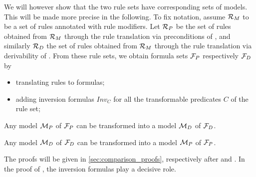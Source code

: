 We will however show that the two rule sets have corresponding sets of
models. This will be made more precise in the following. To fix notation,
assume ${\cal R}_M$ to be a set of rules annotated with rule modifiers. Let
${\cal R}_P$ be the set of rules obtained from ${\cal R}_M$ through the rule
translation via preconditions of , and similarly
${\cal R}_D$ the set of rules obtained from ${\cal R}_M$ through the rule
translation via derivability of . From these rule
sets, we obtain formula sets ${\cal F}_P$ respectively ${\cal F}_D$ by
\begin{itemize}
\item translating rules to formulas;
\item adding inversion formulas $Inv_C$ for all
  the transformable predicates $C$ of the rule set;
\end{itemize}


\begin{proposition}\label{lemma:mp_to_md}
  Any model ${\cal M}_P$ of ${\cal F}_P$ can be transformed into a model
  ${\cal M}_D$ of ${\cal F}_D$.
\end{proposition}

\begin{proposition}\label{lemma:md_to_mp}
  Any model ${\cal M}_D$ of ${\cal F}_D$ can be transformed into a model
  ${\cal M}_P$ of ${\cal F}_P$.
\end{proposition}

The proofs will be given in \ref{sec:comparison_proofs}, respectively after
 and 
.
In the proof of , the
inversion formulas play a decisive role.


